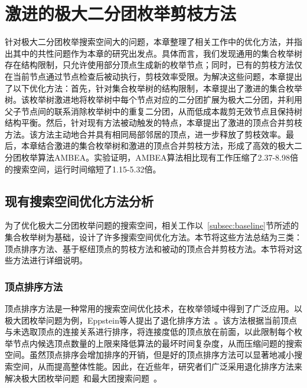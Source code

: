 \chapter{激进的极大二分团枚举剪枝方法}
\label{ch:aggressive_mbe}

针对极大二分团枚举搜索空间大的问题，本章整理了相关工作中的优化方法，并指出其中的共性问题作为本章的研究出发点。具体而言，我们发现通用的集合枚举树存在结构限制，只允许使用部分顶点生成新的枚举节点；同时，已有的剪枝方法仅在当前节点通过节点检查后被动执行，剪枝效率受限。为解决这些问题，本章提出了以下优化方法：首先，针对集合枚举树的结构限制，本章提出了激进的集合枚举树。该枚举树激进地将枚举树中每个节点对应的二分团扩展为极大二分团，并利用父子节点间的联系消除枚举树中的重复二分团，从而低成本裁剪无效节点且保持树结构平衡。然后，针对现有方法被动触发的特点，本章提出了激进的顶点合并剪枝方法。该方法主动地合并具有相同局部邻居的顶点，进一步释放了剪枝效率。最后，本章结合激进的集合枚举树和激进的顶点合并剪枝方法，形成了高效的极大二分团枚举算法AMBEA。实验证明，AMBEA算法相比现有工作压缩了2.37-8.98倍的搜索空间，运行时间缩短了1.15-5.32倍。

\section{现有搜索空间优化方法分析}
\label{sec:opt}

为了优化极大二分团枚举问题的搜索空间，相关工作以~\ref{subsec:baseline}节所述的集合枚举树为基础，设计了许多搜索空间优化方法。本节将这些方法总结为三类：顶点排序方法、基于枢纽顶点的剪枝方法和被动的顶点合并剪枝方法。本节将对这些方法进行详细说明。

\subsection{顶点排序方法}
\label{subsec:order}

顶点排序方法是一种常用的搜索空间优化技术，在枚举领域中得到了广泛应用。以极大团枚举问题为例，Eppstein等人提出了退化排序方法~\cite{MCEdegeneracy10}。该方法根据当前顶点与未选取顶点的连接关系进行排序，将连接度低的顶点放在前面，以此限制每个枚举节点内候选顶点数量的上限来降低算法的最坏时间复杂度，从而压缩问题的搜索空间。虽然顶点排序会增加排序的开销，但是好的顶点排序方法可以显著地减小搜索空间，从而提高整体性能。因此，在近些年，研究者们广泛采用退化排序方法来解决极大团枚举问题~\cite{MCEparallel20,MCE20,MCE22,MCE-GPU21,MCE-22}和最大团搜索问题~\cite{MEC20,MEC22}。



